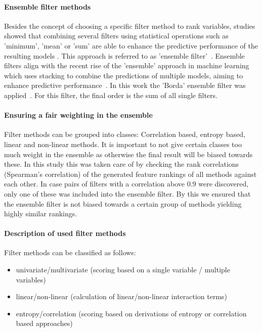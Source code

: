 \documentclass[letterpaper, peerreview]{IEEEtran}
\begin{document}
\paragraph{Ensemble filter methods}

Besides the concept of choosing a specific filter method to rank variables, studies showed that combining several filters using statistical operations such as 'minimum', 'mean' or 'sum' are able to enhance the predictive performance of the resulting models \cite{abeel2010, drotar2017a}.
This approach is referred to as 'ensemble filter'~\cite{dietterich2000}.
Ensemble filters align with the recent rise of the 'ensemble' approach in machine learning which uses stacking to combine the predictions of multiple models, aiming to enhance predictive performance~\cite{polikar2012, feurer2015}.
In this work the 'Borda' ensemble filter was applied~\cite{drotar2017a}.
For this filter, the final order is the sum of all single filters.

\paragraph{Ensuring a fair weighting in the ensemble}

Filter methods can be grouped into classes: Correlation based, entropy based, linear and non-linear methods.
It is important to not give certain classes too much weight in the ensemble as otherwise the final result will be biased towards these.
In this study this was taken care of by checking the rank correlations (Spearman's correlation) of the generated feature rankings of all methods against each other.
In case pairs of filters with a correlation above 0.9 were discovered, only one of these was included into the ensemble filter.
By this we ensured that the ensemble filter is not biased towards a certain group of methods yielding highly similar rankings.

\paragraph{Description of used filter methods}

Filter methods can be classified as follows:

\begin{itemize}
	\item univariate/multivariate (scoring based on a single variable / multiple variables)
	\item linear/non-linear (calculation of linear/non-linear interaction terms)
	\item entropy/correlation (scoring based on derivations of entropy or correlation based approaches)
\end{itemize}
\end{document}
